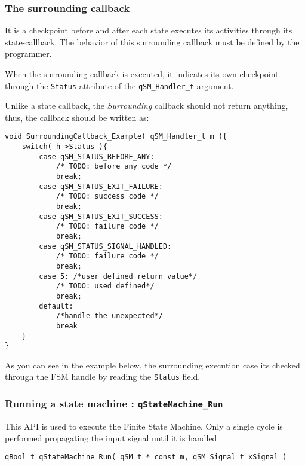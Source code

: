 \subsubsection{The surrounding callback}
It is a checkpoint before and after each state executes its activities through its state-callback. The behavior of this surrounding callback must be defined by the programmer.



When the surrounding callback is executed, it indicates its own checkpoint through the \lstinline{Status} attribute of the \lstinline{qSM_Handler_t} argument.

Unlike a state callback, the \textit{Surrounding} callback should not return anything, thus, the callback should be written as:
\medskip

\begin{lstlisting}[style=CStyle]
void SurroundingCallback_Example( qSM_Handler_t m ){
    switch( h->Status ){
        case qSM_STATUS_BEFORE_ANY:
            /* TODO: before any code */
            break;
        case qSM_STATUS_EXIT_FAILURE:
            /* TODO: success code */
            break;
        case qSM_STATUS_EXIT_SUCCESS:
            /* TODO: failure code */
            break;
        case qSM_STATUS_SIGNAL_HANDLED:
            /* TODO: failure code */
            break;            
        case 5: /*user defined return value*/ 
            /* TODO: used defined*/
            break;
        default: 
            /*handle the unexpected*/
            break
    }
}
\end{lstlisting}  

As you can see in the example below, the surrounding execution case its checked through the FSM handle by reading the \lstinline{Status} field.

\subsubsection{Running a state machine : \texorpdfstring{\lstinline{qStateMachine_Run}}{qStateMachine_Run} }

This API  is used to execute the Finite State Machine. Only a single cycle is performed propagating the input signal until it is handled.
\medskip

\begin{lstlisting}[style=CStyle]
qBool_t qStateMachine_Run( qSM_t * const m, qSM_Signal_t xSignal )
\end{lstlisting}

